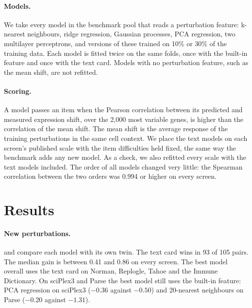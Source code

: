 \documentclass[]{style}
\begin{document}
\paragraph{Models.} We take every model in the benchmark pool that reads a perturbation feature: k-nearest neighbours,
ridge regression, Gaussian processes, PCA regression, two multilayer perceptrons, and versions of these trained on 10\%
or 30\% of the training data. Each model is fitted twice on the same folds, once with the built-in feature and once with
the text card. Models with no perturbation feature, such as the mean shift, are not refitted.

\paragraph{Scoring.} A model passes an item when the Pearson correlation between its predicted and measured expression
shift, over the 2,000 most variable genes, is higher than the correlation of the mean shift. The mean shift is the
average response of the training perturbations in the same cell context. We place the text models on each screen's published scale with the
item difficulties held fixed, the same way the benchmark adds any new model. As a check, we also refitted every scale
with the text models included. The order of all models changed very little: the Spearman correlation between the two
orders was 0.994 or higher on every screen.

\section{Results}

\paragraph{New perturbations.}  and  compare each model with its own twin. The text card
wins in 93 of 105 pairs. The median gain is between 0.41 and 0.86 on every screen. The best model overall uses the text card on Norman, Replogle, Tahoe and
the Immune Dictionary. On sciPlex3 and Parse the best model still uses the built-in feature: PCA regression on
sciPlex3 ($-0.36$ against $-0.50$) and 20-nearest neighbours on Parse ($-0.20$ against $-1.31$).
\end{document}
